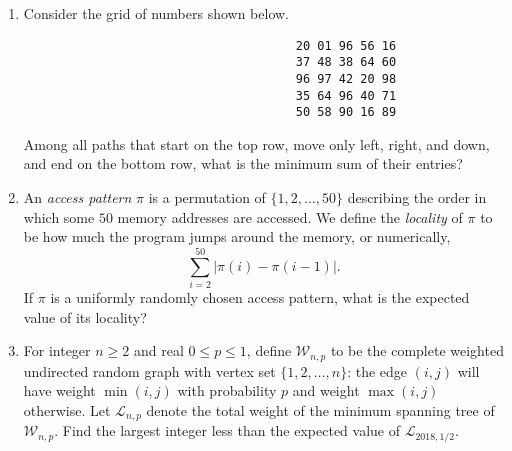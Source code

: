 \documentclass[10pt]{article}
\begin{document}
\begin{enumerate}

\item Consider the grid of numbers shown below.

\begin{center}
\begin{verbatim}
                                      20 01 96 56 16
                                      37 48 38 64 60
                                      96 97 42 20 98
                                      35 64 96 40 71
                                      50 58 90 16 89
\end{verbatim}
\end{center}

Among all paths that start on the top row, move only left, right, and down, and end on the bottom row, what is the minimum sum of their entries?

\item An \textit{access pattern} $\pi$ is a permutation of $\{1,2,\dots,50\}$ describing the order in which some $50$ memory addresses are accessed. We define the \textit{locality} of $\pi$ to be how much the program jumps around the memory, or numerically, \[\sum_{i=2}^{50}\left\lvert\pi(i)-\pi(i-1)\right\rvert.\] If $\pi$ is a uniformly randomly chosen access pattern, what is the expected value of its locality?


\item For integer $n\geq 2$ and real $0\leq p\leq 1$, define $\mathcal{W}_{n,p}$ to be the complete weighted undirected random graph with vertex set $\{1,2,\ldots,n\}$: the edge $(i,j)$ will have weight $\min(i,j)$ with probability $p$ and weight $\max(i,j)$ otherwise. Let $\mathcal{L}_{n,p}$ denote the total weight of the minimum spanning tree of $\mathcal{W}_{n,p}$. Find the largest integer less than the expected value of $\mathcal{L}_{2018,1/2}$.



\end{enumerate}
\end{document}
